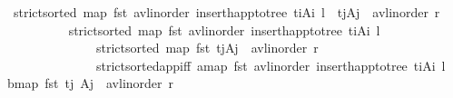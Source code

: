 \begin{isabellebody}
\ {\isachardoublequoteopen}strict{\isacharunderscore}{\kern0pt}sorted\ {\isacharparenleft}{\kern0pt}map\ fst\ {\isacharparenleft}{\kern0pt}avl{\isacharunderscore}{\kern0pt}inorder\ {\isacharparenleft}{\kern0pt}insert{\isacharunderscore}{\kern0pt}happ{\isacharunderscore}{\kern0pt}to{\isacharunderscore}{\kern0pt}tree\ {\isacharparenleft}{\kern0pt}t\isactrlsub i{\isacharcomma}{\kern0pt}A\isactrlsub i{\isacharparenright}{\kern0pt}\ l{\isacharparenright}{\kern0pt}\ {\isacharat}{\kern0pt}\ {\isacharparenleft}{\kern0pt}t\isactrlsub j{\isacharcomma}{\kern0pt}A\isactrlsub j{\isacharparenright}{\kern0pt}\ {\isacharhash}{\kern0pt}\ avl{\isacharunderscore}{\kern0pt}inorder\ r{\isacharparenright}{\kern0pt}{\isacharparenright}{\kern0pt}{\isachardoublequoteclose}\isanewline
\ \ \ \ \ \ \ \ \isamarkupfalse%
\ {\isacartoucheopen}strict{\isacharunderscore}{\kern0pt}sorted\ {\isacharparenleft}{\kern0pt}map\ fst\ {\isacharparenleft}{\kern0pt}avl{\isacharunderscore}{\kern0pt}inorder\ {\isacharparenleft}{\kern0pt}insert{\isacharunderscore}{\kern0pt}happ{\isacharunderscore}{\kern0pt}to{\isacharunderscore}{\kern0pt}tree\ {\isacharparenleft}{\kern0pt}t\isactrlsub i{\isacharcomma}{\kern0pt}A\isactrlsub i{\isacharparenright}{\kern0pt}\ l{\isacharparenright}{\kern0pt}{\isacharparenright}{\kern0pt}{\isacharparenright}{\kern0pt}{\isacartoucheclose}\isanewline
\ \ \ \ \ \ \ \ \ \ \ \ \ \ {\isacartoucheopen}strict{\isacharunderscore}{\kern0pt}sorted\ {\isacharparenleft}{\kern0pt}map\ fst\ {\isacharparenleft}{\kern0pt}{\isacharparenleft}{\kern0pt}t\isactrlsub j{\isacharcomma}{\kern0pt}A\isactrlsub j{\isacharparenright}{\kern0pt}\ {\isacharhash}{\kern0pt}\ avl{\isacharunderscore}{\kern0pt}inorder\ r{\isacharparenright}{\kern0pt}{\isacharparenright}{\kern0pt}{\isacartoucheclose}\isanewline
\ \ \ \ \ \ \ \ \ \ \ \ \ \ strict{\isacharunderscore}{\kern0pt}sorted{\isacharunderscore}{\kern0pt}app{\isacharunderscore}{\kern0pt}iff{\isacharbrackleft}{\kern0pt}\ a{\isacharequal}{\kern0pt}{\isachardoublequoteopen}map\ fst\ {\isacharparenleft}{\kern0pt}avl{\isacharunderscore}{\kern0pt}inorder\ {\isacharparenleft}{\kern0pt}insert{\isacharunderscore}{\kern0pt}happ{\isacharunderscore}{\kern0pt}to{\isacharunderscore}{\kern0pt}tree\ {\isacharparenleft}{\kern0pt}t\isactrlsub i{\isacharcomma}{\kern0pt}A\isactrlsub i{\isacharparenright}{\kern0pt}\ l{\isacharparenright}{\kern0pt}{\isacharparenright}{\kern0pt}{\isachardoublequoteclose}\ \ b{\isacharequal}{\kern0pt}{\isachardoublequoteopen}map\ fst\ {\isacharparenleft}{\kern0pt}{\isacharparenleft}{\kern0pt}t\isactrlsub j{\isacharcomma}{\kern0pt}\ A\isactrlsub j{\isacharparenright}{\kern0pt}\ {\isacharhash}{\kern0pt}\ avl{\isacharunderscore}{\kern0pt}inorder\ r{\isacharparenright}{\kern0pt}{\isachardoublequoteclose}{\isacharbrackright}{\kern0pt}\ \isanewline

\end{isabellebody}
